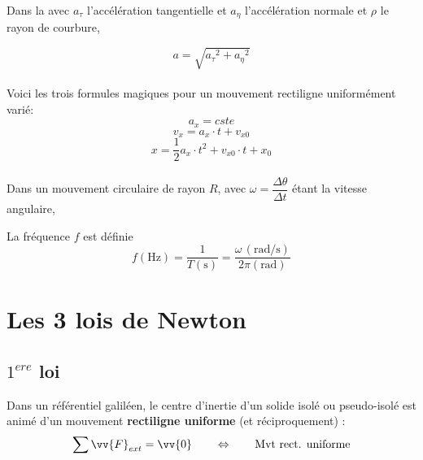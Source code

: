 \documentclass[../MAIN/main.tex]{subfiles}
\begin{document}
\begin{Definition}

Dans la  avec $a_{\tau}$ l'accélération tangentielle et $a_{\eta}$ l'accélération normale et $\rho$ le rayon de courbure,


$$a=\sqrt{{a_{\tau}}^2 + {a_{\eta}}^2}$$\\

Voici les trois formules magiques pour un mouvement rectiligne uniformément varié:
$$a_{x}=cste $$
$$v_{x}=a_{x}\cdot t +v_{x0}$$
$$x=\frac{1}{2}a_{x}\cdot t^2 + v_{x0}\cdot t +x_{0} $$\\

Dans un mouvement circulaire de rayon $R$, avec $\omega = \dfrac{\Delta \theta}{\Delta t}$ étant la vitesse angulaire,\\



La fréquence $f$ est définie
$$f(\text{Hz}) = \dfrac{1}{T(\text{s})} = \dfrac{\omega\, (\text{rad/s})}{2\pi(\text{rad})}$$
\end{Definition}


\section{Les 3 lois de Newton}

\subsection{$1^{ere}$ loi}

\begin{Definition}
Dans un référentiel galiléen, le centre d'inertie d'un solide isolé ou pseudo-isolé est animé d'un mouvement \textbf{rectiligne uniforme} (et réciproquement) :
$$\sum \vv{F}_{ext} = \vv{0} \qquad \Leftrightarrow \qquad \text{Mvt rect. uniforme}$$
\end{Definition}
\end{document}
